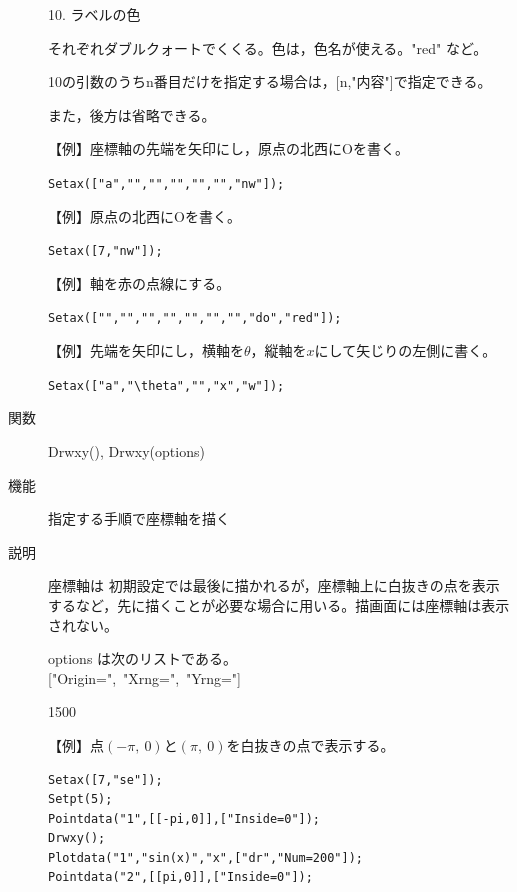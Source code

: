 \documentclass[papersize,a4paper,12pt,uplatex]{jsarticle}
\begin{document}
\begin{description}
10. ラベルの色

それぞれダブルクォートでくくる。色は，色名が使える。"red" など。

10の引数のうちn番目だけを指定する場合は，[n,"内容"]で指定できる。

また，後方は省略できる。

\vspace{\baselineskip}
【例】座標軸の先端を矢印にし，原点の北西にOを書く。

\hspace{10mm} \verb|Setax(["a","","","","","","nw"]);|

【例】原点の北西にOを書く。

\hspace{10mm}\verb|Setax([7,"nw"]);|

【例】軸を赤の点線にする。

\hspace{10mm}\verb|Setax(["","","","","","","","do","red"]);|

【例】先端を矢印にし，横軸を$\theta$，縦軸を$x$にして矢じりの左側に書く。

\hspace{10mm} \verb|Setax(["a","\theta","","x","w"]);|

\vspace{\baselineskip}
\hspace{10mm}


\vspace{\baselineskip}
\hypertarget{drwxy}{}
\item[関数]Drwxy(), Drwxy(options)
\item[機能]指定する手順で座標軸を描く
\item[説明]座標軸は 初期設定では最後に描かれるが，座標軸上に白抜きの点を表示するなど，先に描くことが必要な場合に用いる。描画面には座標軸は表示されない。

options は次のリストである。\\
\hspace*{10mm}["Origin=",\ "Xrng=",\ "Yrng="]

\begin{layer}{150}{0}
\end{layer}

【例】点$(-\pi,\ 0)$と$(\pi,\ 0)$を白抜きの点で表示する。
\begin{verbatim}
Setax([7,"se"]);
Setpt(5);
Pointdata("1",[[-pi,0]],["Inside=0"]);
Drwxy();
Plotdata("1","sin(x)","x",["dr","Num=200"]);
Pointdata("2",[[pi,0]],["Inside=0"]);
\end{verbatim}


\end{description}
\end{document}
